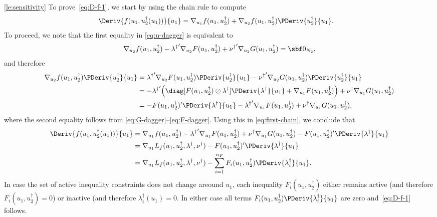 \documentclass[11pt]{article}
\begin{document}
\begin{proof-lemma}{\ref{le:sensitivity}}
  To prove~\eqref{eq:D-f-1}, we start by using the chain rule to
  compute
  \begin{align}\label{eq:first-chain}
    \Deriv{f(u_1,u_2^\dagger(u_1))}{u_1}
    &=\nabla_{u_1} f(u_1,u_2^\dagger)+\nabla_{u_2} f(u_1,u_2^\dagger)\PDeriv{u_2^\dagger}{u_1}.
  \end{align}
  To proceed, we note that the first equality in \eqref{eq:u-dagger}
  is equivalent to
  \begin{align*}
    \nabla_{u_2} f(u_1,u_2^\dagger)-{\lambda^\dagger}'\nabla_{u_2} F(u_1,u_2^\dagger)+{\nu^\dagger}'\nabla_{u_2}G(u_1,u_2^\dagger)=\sbf 0_{N_2},
  \end{align*}
  and therefore
  \begin{align*}
    \nabla_{u_2} f(u_1,u_2^\dagger)\PDeriv{u_2^\dagger}{u_1}
    &={\lambda^\dagger}'\nabla_{u_2} F(u_1,u_2^\dagger)\PDeriv{u_2^\dagger}{u_1}
    -{\nu^\dagger}'\nabla_{u_2}G(u_1,u_2^\dagger)\PDeriv{u_2^\dagger}{u_1}\\
    &=-{\lambda^\dagger}'\Big(\diag[F(u_1,u_2^\dagger)\oslash\lambda^\dagger]\PDeriv{\lambda^\dagger}{u_1}
    +\nabla_{u_1} F(u_1,u_2^\dagger)\Big)
    +{\nu^\dagger}\nabla_{u_1} G(u_1,u_2^\dagger)\\
    &=-F(u_1,u_2^\dagger)'\PDeriv{\lambda^\dagger}{u_1}
    -{\lambda^\dagger}'\nabla_{u_1} F(u_1,u_2^\dagger)
    +{\nu^\dagger}\nabla_{u_1} G(u_1,u_2^\dagger),
  \end{align*}
  where the second equality follows from
  \eqref{eq:G-dagger}--\eqref{eq:F-dagger}.
  Using this in \eqref{eq:first-chain}, we conclude that
  \begin{align*}
    \Deriv{f(u_1,u_2^\dagger(u_1))}{u_1}
    &=\nabla_{u_1} f(u_1,u_2^\dagger)
    -{\lambda^\dagger}' \nabla_{u_1} F(u_1,u_2^\dagger)
    +{\nu^\dagger}\nabla_{u_1} G(u_1,u_2^\dagger)
    -F(u_1,u_2^\dagger)'\PDeriv{\lambda^\dagger}{u_1}\\
    &=\nabla_{u_1}L_f(u_1,u_2^\dagger,\lambda^\dagger,\nu^\dagger)
    -F(u_1,u_2^\dagger)'\PDeriv{\lambda^\dagger}{u_1}\\
    &=\nabla_{u_1}L_f(u_1,u_2^\dagger,\lambda^\dagger,\nu^\dagger)
    -\sum_{i=1}^{n_F}F_i(u_1,u_2^\dagger)\PDeriv{\lambda_i^\dagger}{u_1}.
  \end{align*}
  In case the set of active inequality constraints does not change
  areound $u_1$, each inequality $F_i(u_1,u_2^\dagger)$ either remains
  active (and therefore $F_i(u_1,u_2^\dagger)=0$) or inactive (and
  therefore $\lambda_i^\dagger(u_1)=0$. In either case all terms
  $F_i(u_1,u_2^\dagger)\PDeriv{\lambda_i^\dagger}{u_1}$ are zero
  and~\eqref{eq:D-f-1} follows.


\end{proof-lemma}
\end{document}
